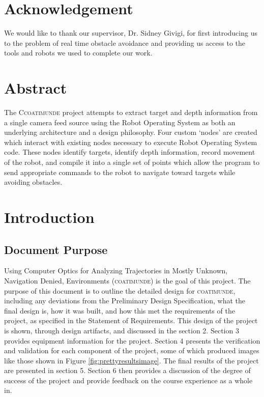 \documentclass{article}[12]
\begin{document}

\section*{Acknowledgement}

We would like to thank our supervisor, Dr. Sidney Givigi, for first introducing us to the problem of real time obstacle avoidance and providing us access to the tools and robots we used to complete our work.

\newpage

\section*{Abstract}

The C\textsc{coatimunde} project attempts to extract target and depth information from a single camera feed source using the Robot Operating System as both an underlying architecture and a design philosophy. Four custom `nodes' are created which interact with existing nodes necessary to execute Robot Operating System code. These nodes identify targets, identify depth information, record movement of the robot, and compile it into a single set of points which allow the program to send appropriate commands to the robot to navigate toward targets while avoiding obstacles.

\newpage
	
\tableofcontents \newpage



\section{Introduction}

	\subsection{Document Purpose}
	
	Using Computer Optics for Analyzing Trajectories in Mostly Unknown, Navigation Denied, Environments (\textsc{coatimunde}) is the goal of this project. The purpose of this document is to outline the detailed design for \textsc{coatimunde}, including any deviations from the Preliminary Design Specification, what the final design is, how it was built, and how this met the requirements of the project, as specified in the Statement of Requirements. 
This design of the project is shown, through design artifacts, and discussed in the section 2. Section 3 provides equipment information for the project. Section 4 presents the verification and validation for each component of the project, some of which produced images like those shown in Figure \ref{fig:prettyresultsimage}. The final results of the project are presented in section 5. Section 6 then provides a discussion of the degree of success of the project and provide feedback on the course experience as a whole in.
	
\end{document}
